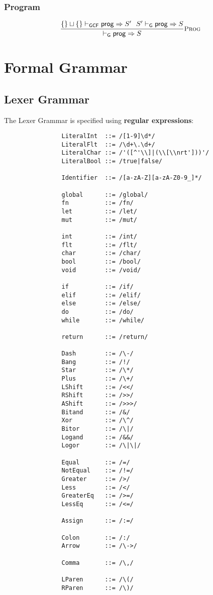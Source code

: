 \documentclass{article}
\newcommand{\drmrule}[5]{\frac{#1}{#2\vdash_{\mathsf{#3}}#4}\textsc{\small{#5}}}
\begin{document}
			\subsubsection{Program}
			
				\begin{align*}
					\drmrule{\{\}\sqcup\{\} \vdash_{\mathsf{GCF}} \mathsf{prog} \Rightarrow S' \ \ S' \vdash_{\mathsf{G}} \mathsf{prog} \Rightarrow S}{}{G}{\mathsf{prog} \Rightarrow S}{Prog}
				\end{align*}
		
	\section{Formal Grammar}
	
		\subsection{Lexer Grammar}
		
			The Lexer Grammar is specified using \textbf{regular expressions}:
			
			\begin{verbatim}
				LiteralInt  ::= /[1-9]\d*/
				LiteralFlt  ::= /\d+\.\d+/
				LiteralChar ::= /'([^'\\]|(\\[\\nrt']))'/
				LiteralBool ::= /true|false/
				
				Identifier  ::= /[a-zA-Z][a-zA-Z0-9_]*/
				
				global      ::= /global/
				fn          ::= /fn/
				let         ::= /let/
				mut         ::= /mut/
				
				int         ::= /int/
				flt         ::= /flt/
				char        ::= /char/
				bool        ::= /bool/
				void        ::= /void/
				
				if          ::= /if/
				elif        ::= /elif/
				else        ::= /else/
				do          ::= /do/
				while       ::= /while/
				
				return      ::= /return/
				
				Dash        ::= /\-/
				Bang        ::= /!/
				Star        ::= /\*/
				Plus        ::= /\+/
				LShift      ::= /<</
				RShift      ::= />>/
				AShift      ::= />>>/
				Bitand      ::= /&/
				Xor         ::= /\^/
				Bitor       ::= /\|/
				Logand      ::= /&&/
				Logor       ::= /\|\|/
				
				Equal       ::= /=/
				NotEqual    ::= /!=/
				Greater     ::= />/
				Less        ::= /</
				GreaterEq   ::= />=/
				LessEq      ::= /<=/
				
				Assign      ::= /:=/
				
				Colon       ::= /:/
				Arrow       ::= /\->/
				
				Comma       ::= /\,/
				
				LParen      ::= /\(/
				RParen      ::= /\)/
			\end{verbatim}
			
\end{document}
